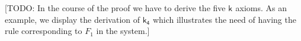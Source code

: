 \documentclass[twoside]{aiml18}
\newcommand{\todo}[1]{{\color{red}[TODO: #1]}}
\newcommand*{\ax}[1]{\mathsf{#1}}
\newcommand*{\kax}[1][]		{\ax{k_{#1}}}
\newcommand*{\lab}{\mathsf{lab}}
\newcommand*{\IK}{\mathsf{IK}}
\newcommand*{\labIKp}{\lab\IK_{\le}}
\begin{document}
%
%
%
%
%


\todo{In the course of the proof we have to derive the five $\kax$ axioms. As an example, we display the derivation of $\kax[4]$ which illustrates the need of having the rule corresponding to $F_1$ in the system.}
\end{document}
